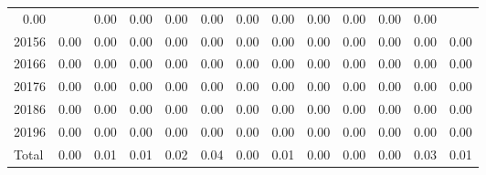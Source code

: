 \begin{table}[!h]
\begin{tabular}{lllllllllllll}
  \multicolumn{1}{|r}{0.00} &
  \multicolumn{1}{r}{} &
  \multicolumn{1}{r}{0.00} &
  \multicolumn{1}{r}{0.00} &
  \multicolumn{1}{r}{0.00} &
  \multicolumn{1}{r}{0.00} &
  \multicolumn{1}{r}{0.00} &
  \multicolumn{1}{r}{0.00} &
  \multicolumn{1}{r}{0.00} &
  \multicolumn{1}{r}{0.00} &
  \multicolumn{1}{r}{0.00} &
  \multicolumn{1}{r}{0.00} \\
\multicolumn{1}{l}{\hspace{1em}20156} &
  \multicolumn{1}{|r}{0.00} &
  \multicolumn{1}{r}{0.00} &
  \multicolumn{1}{r}{0.00} &
  \multicolumn{1}{r}{0.00} &
  \multicolumn{1}{r}{0.00} &
  \multicolumn{1}{r}{0.00} &
  \multicolumn{1}{r}{0.00} &
  \multicolumn{1}{r}{0.00} &
  \multicolumn{1}{r}{0.00} &
  \multicolumn{1}{r}{0.00} &
  \multicolumn{1}{r}{0.00} &
  \multicolumn{1}{r}{0.00} \\
\multicolumn{1}{l}{\hspace{1em}20166} &
  \multicolumn{1}{|r}{0.00} &
  \multicolumn{1}{r}{0.00} &
  \multicolumn{1}{r}{0.00} &
  \multicolumn{1}{r}{0.00} &
  \multicolumn{1}{r}{0.00} &
  \multicolumn{1}{r}{0.00} &
  \multicolumn{1}{r}{0.00} &
  \multicolumn{1}{r}{0.00} &
  \multicolumn{1}{r}{0.00} &
  \multicolumn{1}{r}{0.00} &
  \multicolumn{1}{r}{0.00} &
  \multicolumn{1}{r}{0.00} \\
\multicolumn{1}{l}{\hspace{1em}20176} &
  \multicolumn{1}{|r}{0.00} &
  \multicolumn{1}{r}{0.00} &
  \multicolumn{1}{r}{0.00} &
  \multicolumn{1}{r}{0.00} &
  \multicolumn{1}{r}{0.00} &
  \multicolumn{1}{r}{0.00} &
  \multicolumn{1}{r}{0.00} &
  \multicolumn{1}{r}{0.00} &
  \multicolumn{1}{r}{0.00} &
  \multicolumn{1}{r}{0.00} &
  \multicolumn{1}{r}{0.00} &
  \multicolumn{1}{r}{0.00} \\
\multicolumn{1}{l}{\hspace{1em}20186} &
  \multicolumn{1}{|r}{0.00} &
  \multicolumn{1}{r}{0.00} &
  \multicolumn{1}{r}{0.00} &
  \multicolumn{1}{r}{0.00} &
  \multicolumn{1}{r}{0.00} &
  \multicolumn{1}{r}{0.00} &
  \multicolumn{1}{r}{0.00} &
  \multicolumn{1}{r}{0.00} &
  \multicolumn{1}{r}{0.00} &
  \multicolumn{1}{r}{0.00} &
  \multicolumn{1}{r}{0.00} &
  \multicolumn{1}{r}{0.00} \\
\multicolumn{1}{l}{\hspace{1em}20196} &
  \multicolumn{1}{|r}{0.00} &
  \multicolumn{1}{r}{0.00} &
  \multicolumn{1}{r}{0.00} &
  \multicolumn{1}{r}{0.00} &
  \multicolumn{1}{r}{0.00} &
  \multicolumn{1}{r}{0.00} &
  \multicolumn{1}{r}{0.00} &
  \multicolumn{1}{r}{0.00} &
  \multicolumn{1}{r}{0.00} &
  \multicolumn{1}{r}{0.00} &
  \multicolumn{1}{r}{0.00} &
  \multicolumn{1}{r}{0.00} \\
\multicolumn{1}{l}{\hspace{1em}Total} &
  \multicolumn{1}{|r}{0.00} &
  \multicolumn{1}{r}{0.01} &
  \multicolumn{1}{r}{0.01} &
  \multicolumn{1}{r}{0.02} &
  \multicolumn{1}{r}{0.04} &
  \multicolumn{1}{r}{0.00} &
  \multicolumn{1}{r}{0.01} &
  \multicolumn{1}{r}{0.00} &
  \multicolumn{1}{r}{0.00} &
  \multicolumn{1}{r}{0.00} &
  \multicolumn{1}{r}{0.03} &
  \multicolumn{1}{r}{0.01} \\
\cline{1-13}
\end{tabular}
\end{table}
